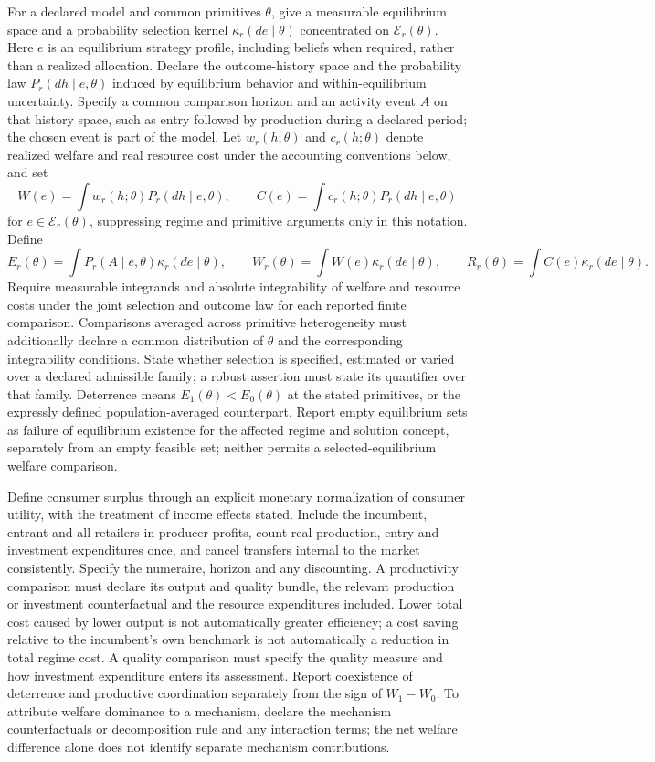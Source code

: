 \documentclass[11pt,a4paper]{article}
\begin{document}
For a declared model and common primitives \(\theta\), give a measurable equilibrium space and a probability selection kernel \(\kappa_r(de\mid\theta)\) concentrated on \(\mathcal E_r(\theta)\). Here \(e\) is an equilibrium strategy profile, including beliefs when required, rather than a realized allocation. Declare the outcome-history space and the probability law \(P_r(dh\mid e,\theta)\) induced by equilibrium behavior and within-equilibrium uncertainty. Specify a common comparison horizon and an activity event \(A\) on that history space, such as entry followed by production during a declared period; the chosen event is part of the model. Let \(w_r(h;\theta)\) and \(c_r(h;\theta)\) denote realized welfare and real resource cost under the accounting conventions below, and set
\[
 W(e)=\int w_r(h;\theta)P_r(dh\mid e,\theta),\qquad
 C(e)=\int c_r(h;\theta)P_r(dh\mid e,\theta)
\]
for \(e\in\mathcal E_r(\theta)\), suppressing regime and primitive arguments only in this notation. Define
\[
 E_r(\theta)=\int P_r(A\mid e,\theta)\kappa_r(de\mid\theta),\qquad
 W_r(\theta)=\int W(e)\kappa_r(de\mid\theta),\qquad
 R_r(\theta)=\int C(e)\kappa_r(de\mid\theta).
\]
Require measurable integrands and absolute integrability of welfare and resource costs under the joint selection and outcome law for each reported finite comparison. Comparisons averaged across primitive heterogeneity must additionally declare a common distribution of \(\theta\) and the corresponding integrability conditions. State whether selection is specified, estimated or varied over a declared admissible family; a robust assertion must state its quantifier over that family. Deterrence means \(E_1(\theta)<E_0(\theta)\) at the stated primitives, or the expressly defined population-averaged counterpart. Report empty equilibrium sets as failure of equilibrium existence for the affected regime and solution concept, separately from an empty feasible set; neither permits a selected-equilibrium welfare comparison.

Define consumer surplus through an explicit monetary normalization of consumer utility, with the treatment of income effects stated. Include the incumbent, entrant and all retailers in producer profits, count real production, entry and investment expenditures once, and cancel transfers internal to the market consistently. Specify the numeraire, horizon and any discounting. A productivity comparison must declare its output and quality bundle, the relevant production or investment counterfactual and the resource expenditures included. Lower total cost caused by lower output is not automatically greater efficiency; a cost saving relative to the incumbent's own benchmark is not automatically a reduction in total regime cost. A quality comparison must specify the quality measure and how investment expenditure enters its assessment. Report coexistence of deterrence and productive coordination separately from the sign of \(W_1-W_0\). To attribute welfare dominance to a mechanism, declare the mechanism counterfactuals or decomposition rule and any interaction terms; the net welfare difference alone does not identify separate mechanism contributions.
\end{document}
